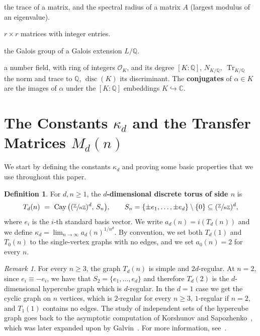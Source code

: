 \documentclass{article}
\theoremstyle{plain}
\theoremstyle{definition}
\newtheorem{definition}[theorem]{Definition}
\theoremstyle{remark}
\newtheorem{remark}[theorem]{Remark}
\newcommand{\Z}{\mathbb{Z}}
\newcommand{\Q}{\mathbb{Q}}
\newcommand{\C}{\mathbb{C}}
\newcommand{\quot}[2]{\sfrac{#1}{#2}}
\DeclareMathOperator{\Cay}{Cay}
\DeclareMathOperator{\tr}{tr}
\DeclareMathOperator{\Gal}{Gal}
\DeclareMathOperator{\Mat}{Mat}
\begin{document}
\begin{description}[leftmargin=2.2cm,style=nextline]
\item[$\tr,\ \rho(A)$] the trace of a matrix, and the spectral radius of a matrix $A$ (largest modulus of an eigenvalue).
\item[$\Mat_r(\Z)$] $r\times r$ matrices with integer entries.
\item[$\Gal(L/\Q)$] the Galois group of a Galois extension $L/\Q$.
\item[{$K$}] a number field, with ring of integers $\mathcal O_K$, and its degree $[K:\Q]$, $N_{K/\Q},\ \operatorname{Tr}_{K/\Q}$ the norm and trace to $\Q$, $\operatorname{disc}(K)$ its discriminant. The \textbf{conjugates} of $\alpha\in K$ are the images of $\alpha$ under the $[K:\Q]$ embeddings $K\hookrightarrow\C$.
\end{description}

\section{The Constants $\kappa_d$ and the Transfer Matrices $M_d(n)$}\label{sec:kappa}

We start by defining the constants $\kappa_d$ and proving some basic properties that we use throughout this paper. 

\begin{definition}\label{def:torus}
For $d,n\ge1$, the \textbf{$d$-dimensional discrete torus of side $n$} is
\[
T_d(n)\ =\ \Cay\big((\quot{\Z}{n\Z})^d,\,S_n\big),\qquad S_n=\{\pm e_1,\dots,\pm e_d\}\setminus\{0\}\subseteq(\quot{\Z}{n\Z})^d,
\]
where $e_i$ is the $i$-th standard basis vector. We write $a_d(n)=i(T_d(n))$ and we define $\kappa_d=\lim_{n\to\infty}a_d(n)^{1/n^d}$. By convention, we set both $T_d(1)$ and $T_0(n)$ to the single-vertex graphs with no edges, and we set $a_0(n)=2$ for every $n$.
\end{definition}

\begin{remark}
    For every $n\ge3$, the graph $T_d(n)$ is simple and $2d$-regular. At $n=2$, since $e_i\equiv-e_i$, we have that $S_2=\{e_1,\dots,e_d\}$ and therefore $T_d(2)$ is the $d$-dimensional hypercube graph which is $d$-regular. In the $d=1$ case we get the cyclic graph on $n$ vertices, which is $2$-regular for every $n \geq 3$, $1$-regular if $n=2$, and $T_1(1)$ contains no edges. The study of independent sets of the hypercube graph goes back to the asymptotic computation of Korshunov and Sapozhenko~\cite{korshunov1983number, sapozhenko1987number}, which was later expanded upon by Galvin~\cite{galvin2011threshold, galvin2019independent}. For more information, see~\cite{JenssenPerkins2020}.
\end{remark}
\end{document}
